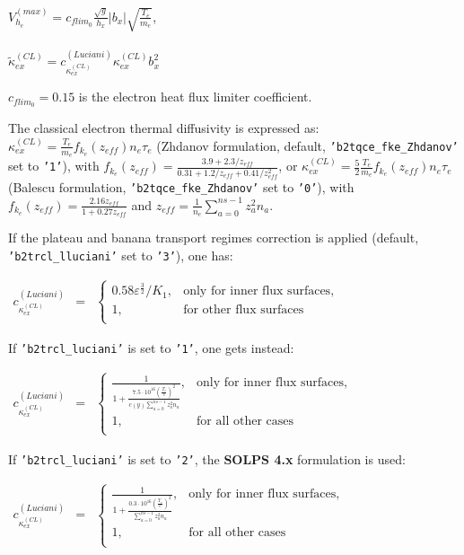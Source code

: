 \documentclass[a4paper,10pt]{report}
\newcommand\SOLPSfour{{\bf SOLPS 4.x} }
\begin{document}
$V_{h_e}^{(max)} = c_{flim_0} \frac{\sqrt g}{h_x}|b_x| \sqrt{\frac{T_e}{m_e}}$,\\\\
$\widetilde{\kappa}_{ex}^{(CL)} = c_{\kappa_{ex}^{(CL)}}^{(Luciani)} \kappa_{ex}^{(CL)} b_x^2$

$c_{flim_0} = 0.15$ is the electron heat flux limiter coefficient. 

The classical electron thermal diffusivity is expressed as:
$\kappa_{ex}^{(CL)} = \frac{T_e}{m_e} f_{k_e} \left( z_{eff} \right) n_e \tau_e$ (Zhdanov formulation, default, {\tt 'b2tqce\_fke\_Zhdanov'} set to {\tt '1'}), with
$f_{k_e}\left( z_{eff} \right )=
\frac{3.9 + 2.3/z_{eff}}{0.31 + 1.2/z_{eff} + 0.41/z_{eff}^2}$,
or
$\kappa_{ex}^{(CL)} = \frac 5 2\frac{T_e}{m_e} f_{k_e}
\left( z_{eff} \right) n_e \tau_e$ (Balescu formulation, {\tt 'b2tqce\_fke\_Zhdanov'} set to {\tt '0'}), with
$f_{k_e} \left( z_{eff} \right) = \frac{2.16 z_{eff}}{1 + 0.27 z_{eff}}$
and
$z_{eff} = \frac{1}{n_e} \sum \limits_{a=0}^{ns-1} z_a^2 n_a$.

If the plateau and banana transport regimes correction is applied (default, {\tt 'b2trcl\_lluciani'} set to {\tt '3'}), one has:

$
\begin{matrix}
c_{\kappa_{ex}^{(CL)}}^{(Luciani)} & =
& \left\{
\begin{matrix}
0.58 \varepsilon^{\frac{3}{2}}/K_1, & \text{only for inner flux surfaces,} \\
1, &  \text{for other flux surfaces} \\
\end{matrix} \right.
\end{matrix}
$

If {\tt 'b2trcl\_luciani'} is set to {\tt '1'}, one gets instead:

$
\begin{matrix}
c_{\kappa_{ex}^{(CL)}}^{(Luciani)} & =
& \left\{
\begin{matrix}
\frac 1 {
1 + \frac{
7.5 \cdot 10^{16} \left( \frac{T_e} e \right)^2}
{c(y) \sum \limits_{a=0}^{ns-1} z_a^2 n_a}
}
, &  \text{only for inner flux surfaces,} \\
1, &  \text{for all other cases} \\
\end{matrix} \right.
\end{matrix}
$

If {\tt 'b2trcl\_luciani'} is set to {\tt '2'}, the \SOLPSfour formulation is used:

$
\begin{matrix}
c_{\kappa_{ex}^{(CL)}}^{(Luciani)} & =
& \left\{
\begin{matrix}
\frac 1 {
1 + \frac{
0.3 \cdot 10^{16} \left( \frac{T_e} e \right)^2}
{\sum \limits_{a=0}^{ns-1} z_a^2 n_a}
}
, &  \text{only for inner flux surfaces,} \\
1, &  \text{for all other cases} \\
\end{matrix} \right.
\end{matrix}
$
\end{document}
